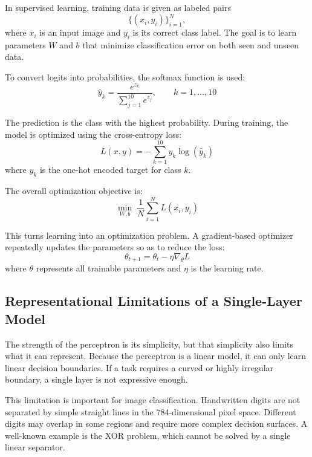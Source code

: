 \documentclass[11pt]{article}
\begin{document}
In supervised learning, training data is given as labeled pairs
\[
\{(x_i, y_i)\}_{i=1}^{N},
\]
where $x_i$ is an input image and $y_i$ is its correct class label. The goal is to learn parameters $W$ and $b$ that minimize classification error on both seen and unseen data.

To convert logits into probabilities, the softmax function is used:
\begin{equation}
\hat{y}_k = \frac{e^{z_k}}{\sum_{j=1}^{10} e^{z_j}}, \qquad k=1,\dots,10
\end{equation}

The prediction is the class with the highest probability. During training, the model is optimized using the cross-entropy loss:
\begin{equation}
L(x,y) = - \sum_{k=1}^{10} y_k \log(\hat{y}_k)
\end{equation}
where $y_k$ is the one-hot encoded target for class $k$.

The overall optimization objective is:
\begin{equation}
\min_{W,b} \; \frac{1}{N} \sum_{i=1}^{N} L(x_i, y_i)
\end{equation}

This turns learning into an optimization problem. A gradient-based optimizer repeatedly updates the parameters so as to reduce the loss:
\begin{equation}
\theta_{t+1} = \theta_t - \eta \nabla_{\theta} L
\end{equation}
where $\theta$ represents all trainable parameters and $\eta$ is the learning rate.

\subsection{Representational Limitations of a Single-Layer Model}

The strength of the perceptron is its simplicity, but that simplicity also limits what it can represent. Because the perceptron is a linear model, it can only learn linear decision boundaries. If a task requires a curved or highly irregular boundary, a single layer is not expressive enough.

This limitation is important for image classification. Handwritten digits are not separated by simple straight lines in the 784-dimensional pixel space. Different digits may overlap in some regions and require more complex decision surfaces. A well-known example is the XOR problem, which cannot be solved by a single linear separator.
\end{document}
